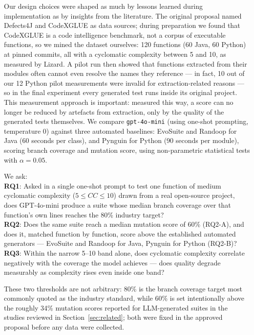 Our design choices were shaped as much by lessons learned during implementation as by
insights from the literature. The original proposal named Defects4J and CodeXGLUE as data
sources; during preparation we found that CodeXGLUE is a code intelligence benchmark, not
a corpus of executable functions, so we mined the dataset ourselves: 120 functions
(60 Java, 60 Python) at pinned commits, all with a cyclomatic complexity between 5 and 10,
as measured by Lizard. A pilot run then showed that functions extracted from their modules
often cannot even resolve the names they reference --- in fact, 10 out of our 12 Python
pilot measurements were invalid for extraction-related reasons --- so in the final
experiment
every generated test runs inside its original project. This measurement approach is
important: measured this way, a score can no longer be reduced by artefacts from
extraction, only by the quality of the generated tests themselves. We compare
\texttt{gpt-4o-mini} (using one-shot prompting, temperature $0$) against three automated
baselines: EvoSuite and Randoop for Java (60 seconds per class), and Pynguin for Python
(90 seconds per module), scoring branch coverage and mutation score, using non-parametric
statistical tests with $\alpha = 0.05$.

We ask: \\
\textbf{RQ1}: Asked in a single one-shot prompt to test one function of medium cyclomatic
complexity ($5 \le CC \le 10$) drawn from a real open-source project, does GPT-4o-mini
produce a suite whose median branch coverage over that function's own lines reaches the
80\% industry target? \\
\textbf{RQ2}: Does the same suite reach a median mutation score of 60\% (RQ2-A), and does
it, matched function by function, score above the established automated generators ---
EvoSuite and Randoop for Java, Pynguin for Python (RQ2-B)? \\
\textbf{RQ3}: Within the narrow 5--10 band alone, does cyclomatic complexity correlate
negatively with the coverage the model achieves --- does quality degrade measurably as
complexity rises even inside one band?

These two thresholds are not arbitrary: 80\% is the branch coverage target most commonly
quoted as the industry standard, while 60\% is set intentionally above the roughly 34\%
mutation scores reported for LLM-generated suites in the studies reviewed in
Section~\ref{sec:related}; both were fixed in the approved proposal before any data were
collected.

